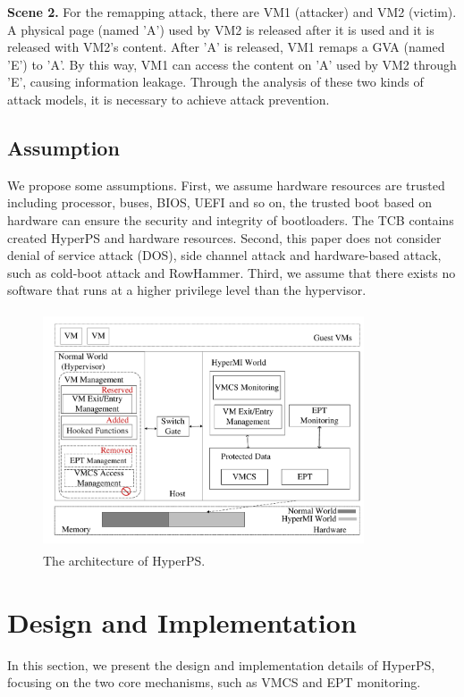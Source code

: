 \documentclass[conference]{IEEEtran}
\begin{document}
\textbf{Scene 2.}
    For the remapping attack, there are VM1 (attacker) and VM2 (victim). A physical page (named 'A') used by VM2 is released after it is used and it is released with VM2's content. After 'A' is released, VM1 remaps a GVA (named 'E') to 'A'. By this way, VM1 can access the content on 'A' used by VM2 through 'E', causing information leakage.
Through the analysis of these two kinds of attack models, it is necessary to achieve attack prevention.


\subsection{Assumption}
We propose some assumptions.
First, we assume hardware resources are trusted including processor, buses, BIOS, UEFI and so on, the trusted boot based on hardware can ensure the security and integrity of bootloaders. The TCB contains created HyperPS and hardware resources. Second, this paper does not consider denial of service attack (DOS), side channel attack and hardware-based attack, such as cold-boot attack and RowHammer. Third, we assume that there exists no software that runs at a higher privilege level than the hypervisor.


\begin{figure}
\centerline{\includegraphics[width=9.5cm, height=7cm]{pdfHyperPSArch.pdf}}%
\caption{The architecture of HyperPS. } \label{fig1}
\end{figure}


\section{Design and Implementation}\label{sec:design}

In this section, we present the design and implementation
details of HyperPS, focusing on the two core mechanisms, such as VMCS and EPT monitoring.
\end{document}

